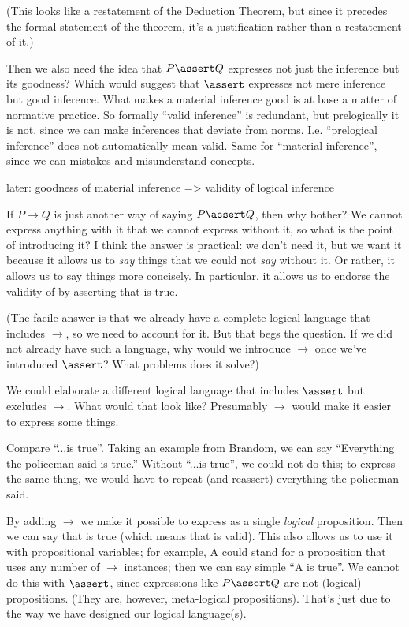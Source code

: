 \documentclass{article}
\begin{document}
(This looks like a restatement of the Deduction Theorem, but since it
precedes the formal statement of the theorem, it's a justification
rather than a restatement of it.)

Then we also need the idea that \(P\linfer Q\) expresses not just the
inference but its goodness? Which would suggest that \(\linfer\)
expresses not mere inference but good inference. What makes a material
inference good is at base a matter of normative practice. So formally
``valid inference'' is redundant, but prelogically it is not, since we
can make inferences that deviate from norms. I.e. ``prelogical
inference'' does not automatically mean valid. Same for ``material
inference'', since we can mistakes and misunderstand concepts.

later: goodness of material inference => validity of logical inference

If \(P\rightarrow Q\) is just another way of saying \(P\linfer Q\),
then why bother? We cannot express anything with it that we cannot
express without it, so what is the point of introducing it? I think
the answer is practical: we don't need it, but we want it because it
allows us to \textit{say} things that we could not \textit{say}
without it. Or rather, it allows us to say things more concisely. In
particular, it allows us to endorse the validity of \PinfQ by
asserting that \PimplQ is true.

(The facile answer is that we already have a complete logical language
that includes \(\rightarrow\), so we need to account for it. But that
begs the question. If we did not already have such a language, why
would we introduce \(\rightarrow\) once we've introduced \(\linfer\)?
What problems does it solve?)

We could elaborate a different logical language that includes
\(\linfer\) but excludes \(\rightarrow\). What would that look like?
Presumably \(\rightarrow\) would make it easier to express some
things.

Compare ``...is true''. Taking an example from Brandom, we can say
``Everything the policeman said is true.'' Without ``...is true'', we
could not do this; to express the same thing, we would have to repeat
(and reassert) everything the policeman said.

By adding \(\rightarrow\) we make it possible to express \PinfQ as a
single \textit{logical} proposition. Then we can say that \PimplQ is
true (which means that \PinfQ is valid). This also allows us to use it with
propositional variables; for example, A could stand for a proposition
that uses any number of \(\rightarrow\) instances; then we can say
simple ``A is true''. We cannot do this with \(\linfer\), since
expressions like \(P\linfer Q\) are not (logical) propositions. (They
are, however, meta-logical propositions). That's just due to the way
we have designed our logical language(s).
\end{document}
